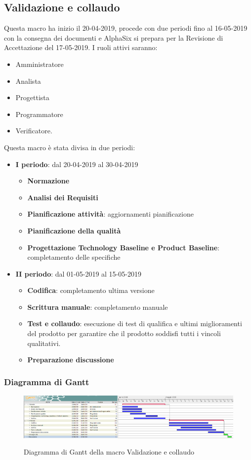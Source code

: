         \subsection{Validazione e collaudo}
        Questa macro ha inizio il 20-04-2019, procede con due periodi fino al 16-05-2019 con la consegna dei documenti e AlphaSix si
        prepara per la Revisione di Accettazione del 17-05-2019. I ruoli attivi saranno: 
        \begin{itemize}
            \item Amministratore
            \item Analista
            \item Progettista
            \item Programmatore
            \item Verificatore.
        \end{itemize}
        Questa macro è stata divisa in due periodi:
		\begin{itemize}
			\item \textbf{I periodo}: dal 20-04-2019 al 30-04-2019
			\begin{itemize}
    	        \item \textbf{Normazione}
    	        \item \textbf{Analisi dei Requisiti}
    	        \item \textbf{Pianificazione attività}: aggiornamenti pianificazione
    	        \item \textbf{Pianificazione della qualità}
    	        \item \textbf{Progettazione Technology Baseline e Product Baseline}: completamento delle specifiche
        	\end{itemize}
			\item \textbf{II periodo}: dal 01-05-2019 al 15-05-2019
			\begin{itemize}
    	        \item \textbf{Codifica}: completamento ultima versione
    	        \item \textbf{Scrittura manuale}: completamento manuale
    	        \item \textbf{Test e collaudo}: esecuzione di test di qualifica e ultimi miglioramenti del prodotto per
    	        garantire che il prodotto soddisfi tutti i vincoli qualitativi.
    	        \item \textbf{Preparazione discussione}
        	\end{itemize}
		\end{itemize}
        
        \begin{landscape}
			\subsubsection{Diagramma di Gantt}        
			\begin{figure}[H]
					\centering
					\includegraphics[scale=0.44]{img/Validazione_e_collaudo.png}\\
					\caption{Diagramma di Gantt della macro Validazione e collaudo}
			\end{figure}
		\end{landscape}
		\newpage
